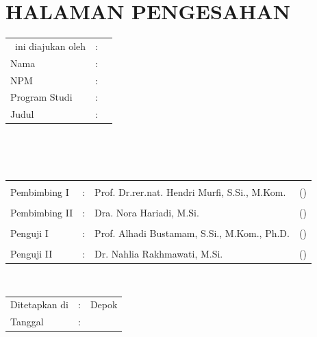%
%
%

\chapter*{HALAMAN PENGESAHAN}

\vspace*{0.4cm}
\noindent 

\noindent
\begin{tabular}{ll p{9cm}}
	\type~ini diajukan oleh&: & \\
	Nama&: & \penulis \\
	NPM&: & \npm \\
	Program Studi&: & \program \\
	Judul \type&: & \judul \\
\end{tabular} \\

\vspace*{1.0cm}

\noindent {}\\[0.2cm]

\begin{center}
\end{center}

\vspace*{0.3cm}

\begin{tabular}{l l l l}
	& & & \\
	Pembimbing I & : & Prof. Dr.rer.nat. Hendri Murfi, S.Si., M.Kom. & (\hspace*{3.0cm}) \\
	& & & \\
	Pembimbing II & : & Dra. Nora Hariadi, M.Si. & (\hspace*{3.0cm}) \\
	& & & \\
	Penguji I & : & Prof. Alhadi Bustamam, S.Si., M.Kom., Ph.D. & (\hspace*{3.0cm}) \\
	& & & \\
	Penguji II & : & Dr. Nahlia Rakhmawati, M.Si. & (\hspace*{3.0cm}) \\
\end{tabular}\\


\vspace*{2.0cm}

\begin{tabular}{ll l}
	Ditetapkan di&: & Depok\\
	Tanggal&: & \tanggalLulus \\
\end{tabular}


\newpage
